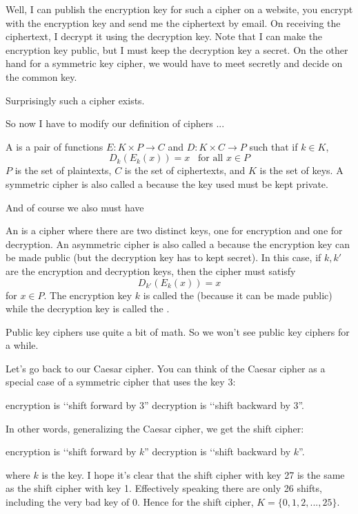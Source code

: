 Well, I can publish the encryption key for such a cipher on a
website, you encrypt with the encryption key and send me the ciphertext by
email.
On receiving the ciphertext, I decrypt it using the decryption key.
Note that I can make the encryption key public, but I must keep
the decryption key a secret.
On the other hand for a symmetric key cipher, we would have to meet secretly
and decide on the common key.

Surprisingly such a cipher exists.

So now I have to modify our definition of ciphers ...

\begin{defn}
A
is
a pair of functions
$E: K \times P \rightarrow C$ and
$D: K \times C \rightarrow P$ such that
if $k \in K$,
\[
D_k(E_k(x)) = x \,\,\, \text{ for all } x \in P
\]
$P$ is the set of plaintexts, $C$ is the set of ciphertexts,
and $K$ is the set of keys.
A symmetric cipher is also called a 
because the key used must be kept private.
\end{defn}

And of course we also must have 

\begin{defn}
An
is a cipher where there are two distinct keys,
one for encryption and one for decryption.
An asymmetric cipher is also called a
because the encryption key can be
made public (but the decryption key has to kept secret).
In this case, if $k,k'$ are the encryption and decryption keys,
then the cipher must satisfy
\[
D_{k'}(E_k(x)) = x
\]
for $x \in P$.
The encryption key $k$ is called the  (because it can be
made public)
while the decryption key is called the .
\end{defn}



Public key ciphers use quite a bit of math.
So we won't see public key ciphers for a while.

Let's go back to our Caesar cipher.
You can think of the Caesar cipher as a special case of a symmetric cipher that
uses the key 3:
\begin{myenum}
\li encryption is \lq\lq shift forward by 3''
\li decryption is \lq\lq shift backward by 3''.
\end{myenum}
In other words, generalizing the Caesar cipher, we get the shift cipher:
\begin{myenum}
\li encryption is \lq\lq shift forward by $k$''
\li decryption is \lq\lq shift backward by $k$''.
\end{myenum}
where $k$ is the key.
I hope it's clear that the shift cipher with key 27 is
the same as the shift cipher with key 1.
Effectively speaking there are only 26 shifts, including
the very bad key of 0.
Hence for the shift cipher, $K = \{0, 1, 2, ..., 25\}$.


